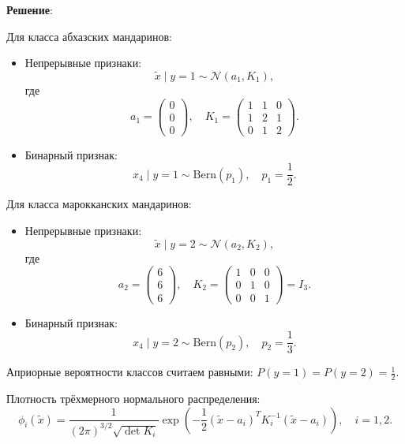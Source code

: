 \documentclass[pract]{SCWorks}
\begin{document}
    \textbf{Решение}:

    Для класса абхазских мандаринов:
    \begin{itemize}
    \item[$\bullet$] Непрерывные признаки:
    \[
    \tilde{x} \mid y=1 \sim \mathcal{N}(a_1, K_1),
    \]
    где
    \[
    a_1 = \begin{pmatrix} 0 \\ 0 \\ 0 \end{pmatrix}, \quad
    K_1 = \begin{pmatrix}
        1 & 1 & 0 \\
        1 & 2 & 1 \\
        0 & 1 & 2
    \end{pmatrix}.
    \]

    \item[$\bullet$] Бинарный признак:
    \[
    x_4 \mid y=1 \sim \mathrm{Bern}(p_1), \quad p_1 = \frac{1}{2}.
    \]
    \end{itemize}

    Для класса марокканских мандаринов:

\begin{itemize}
    \item[$\bullet$] Непрерывные признаки:
    \[
    \tilde{x} \mid y=2 \sim \mathcal{N}(a_2, K_2),
    \]
    где
    \[
    a_2 = \begin{pmatrix} 6 \\ 6 \\ 6 \end{pmatrix}, \quad
    K_2 = \begin{pmatrix}
        1 & 0 & 0 \\
        0 & 1 & 0 \\
        0 & 0 & 1
    \end{pmatrix} = I_3.
    \]

    \item[$\bullet$] Бинарный признак:
    \[
    x_4 \mid y=2 \sim \mathrm{Bern}(p_2), \quad p_2 = \frac{1}{3}.
    \]
    \end{itemize}

    Априорные вероятности классов считаем равными: $P(y=1) = P(y=2) = \frac{1}{2}$.

    Плотность трёхмерного нормального распределения:
    \[
    \phi_i(\tilde{x}) = \frac{1}{(2\pi)^{3/2} \sqrt{\det K_i}}
    \exp\left(-\frac{1}{2} (\tilde{x} - a_i)^T K_i^{-1} (\tilde{x} - a_i)\right),
    \quad i = 1, 2.
    \]
\end{document}
